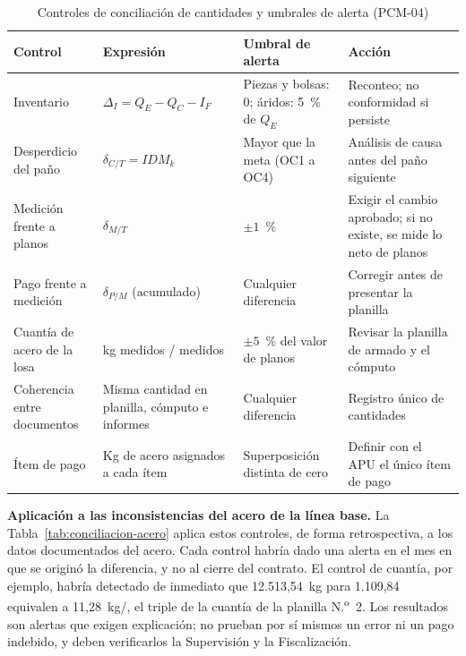 \begin{table}[H]
\caption{Controles de conciliación de cantidades y umbrales de alerta (PCM-04)}
\label{tab:tolerancias}
\setlength{\tabcolsep}{4pt}
\begin{tabularx}{\linewidth}{@{}P{3.6cm}P{3.4cm}P{3.6cm}L@{}}
\toprule
\textbf{Control} & \textbf{Expresión} & \textbf{Umbral de alerta} & \textbf{Acción} \\
\midrule
Inventario & $\Delta_I = Q_E - Q_C - I_F$ & Piezas y bolsas: 0; áridos: 5~\% de $Q_E$ & Reconteo; no conformidad si persiste \\
Desperdicio del paño & $\delta_{C/T} = IDM_k$ & Mayor que la meta (OC1 a OC4) & Análisis de causa antes del paño siguiente \\
Medición frente a planos & $\delta_{M/T}$ & $\pm 1$~\% & Exigir el cambio aprobado; si no existe, se mide lo neto de planos \\
Pago frente a medición & $\delta_{P/M}$ (acumulado) & Cualquier diferencia & Corregir antes de presentar la planilla \\
Cuantía de acero de la losa & kg medidos / \mdos{} medidos & $\pm 5$~\% del valor de planos & Revisar la planilla de armado y el cómputo \\
Coherencia entre documentos & Misma cantidad en planilla, cómputo e informes & Cualquier diferencia & Registro único de cantidades \\
Ítem de pago & Kg de acero asignados a cada ítem & Superposición distinta de cero & Definir con el APU el único ítem de pago \\
\bottomrule
\end{tabularx}
\end{table}

\textbf{Aplicación a las inconsistencias del acero de la línea base.} La Tabla~\ref{tab:conciliacion-acero} aplica estos controles, de forma retrospectiva, a los datos documentados del acero. Cada control habría dado una alerta en el mes en que se originó la diferencia, y no al cierre del contrato. El control de cuantía, por ejemplo, habría detectado de inmediato que 12.513,54~kg para 1.109,84~\mdos{} equivalen a 11,28~kg/\mdos{}, el triple de la cuantía de la planilla N.\textsuperscript{o}~2. Los resultados son alertas que exigen explicación; no prueban por sí mismos un error ni un pago indebido, y deben verificarlos la Supervisión y la Fiscalización.

